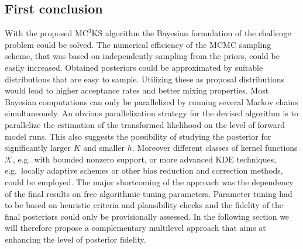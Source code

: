 \subsection{First conclusion}
With the proposed \(\text{MC}^3\text{KS}\) algorithm the Bayesian formulation of the challenge problem could be solved.
The numerical efficiency of the MCMC sampling scheme, that was based on independently sampling from the priors, could be easily increased.
Obtained posteriors could be approximated by suitable distributions that are easy to sample.
Utilizing these as proposal distributions would lead to higher acceptance rates and better mixing properties.
Most Bayesian computations can only be parallelized by running several Markov chains simultaneously.
An obvious parallelization strategy for the devised algorithm is to parallelize the estimation of the transformed likelihood on the level of forward model runs.
This also suggests the possibility of studying the posterior for significantly larger \(K\) and smaller \(h\).
Moreover different classes of kernel functions \(\mathcal{K}\), e.g.\ with bounded nonzero support,
or more advanced KDE techniques, e.g.\ locally adaptive schemes or other bias reduction and correction methods, could be employed.
The major shortcoming of the approach was the dependency of the final results on free algorithmic tuning parameters.
Parameter tuning had to be based on heuristic criteria and plausibility checks and the fidelity of the final posteriors could only be provisionally assessed.
In the following section we will therefore propose a complementary multilevel approach that aims at enhancing the level of posterior fidelity.
